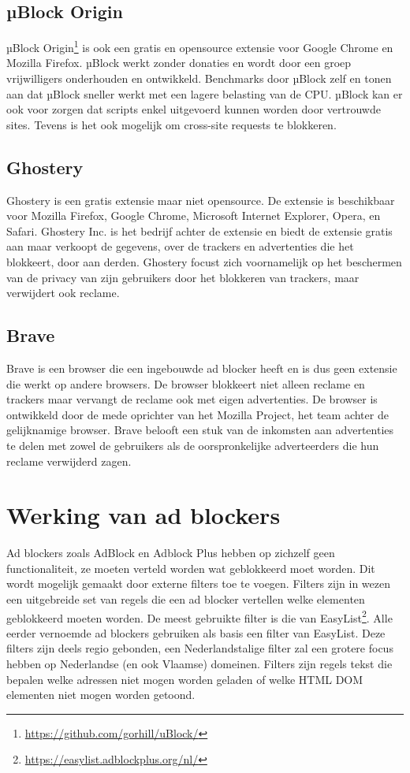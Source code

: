 \documentclass[pdftex,a4paper,12pt,twoside]{report}
\begin{document}
\subsection{µBlock Origin}
\label{sec:uBlock Origin}
µBlock Origin\footnote{\url{https://github.com/gorhill/uBlock/}} is ook een gratis en opensource extensie voor Google Chrome en Mozilla Firefox. µBlock werkt zonder donaties en wordt door een groep vrijwilligers onderhouden en ontwikkeld. Benchmarks door µBlock zelf en \citep{PerformanceAB} tonen aan dat µBlock sneller werkt met een lagere belasting van de CPU. µBlock kan er ook voor zorgen dat scripts enkel uitgevoerd kunnen worden door vertrouwde sites. Tevens is het ook mogelijk om cross-site requests te blokkeren.

\subsection{Ghostery}
\label{sec:Ghostery}
Ghostery is een gratis extensie maar niet opensource. De extensie is beschikbaar voor  Mozilla Firefox, Google Chrome, Microsoft Internet Explorer, Opera, en Safari. Ghostery Inc. is het bedrijf achter de extensie en biedt de extensie gratis aan maar verkoopt de gegevens, over de trackers en advertenties die het blokkeert, door aan derden. Ghostery focust zich voornamelijk op het beschermen van de privacy van zijn gebruikers door het blokkeren van trackers, maar verwijdert ook reclame.
\subsection{Brave}
\label{sec:Brave}
Brave is een browser die een ingebouwde ad blocker heeft en is dus geen extensie die werkt op andere browsers. De browser blokkeert niet alleen reclame en trackers maar vervangt de reclame ook met eigen advertenties. De browser is ontwikkeld door de mede oprichter van het Mozilla Project, het team achter de gelijknamige browser. Brave belooft een stuk van de inkomsten aan advertenties te delen met zowel de gebruikers als de oorspronkelijke adverteerders die hun reclame verwijderd zagen.

\section{Werking van ad blockers}
\label{ch:Werking van ad blockers}
Ad blockers zoals AdBlock en Adblock Plus hebben op zichzelf geen functionaliteit, ze moeten verteld worden wat geblokkeerd moet worden. Dit wordt mogelijk gemaakt door externe filters toe te voegen. Filters zijn in wezen een uitgebreide set van regels die een ad blocker vertellen welke elementen geblokkeerd moeten worden. De meest gebruikte filter is die van EasyList\footnote{\url{https://easylist.adblockplus.org/nl/}}. Alle eerder vernoemde ad blockers gebruiken als basis een filter van EasyList. Deze filters zijn deels regio gebonden, een Nederlandstalige filter zal een grotere focus hebben op Nederlandse (en ook Vlaamse) domeinen. Filters zijn regels tekst die bepalen welke adressen niet mogen worden geladen of welke HTML DOM elementen niet mogen worden getoond.
\end{document}
